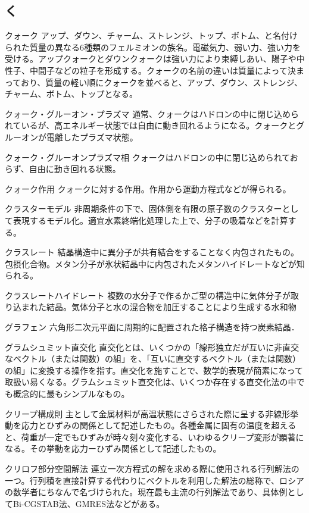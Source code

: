 \begin{用語集}
\section{く}
\item{クォーク}{}
{アップ、ダウン、チャーム、ストレンジ、トップ、ボトム、と名付けられた質量の異なる6種類のフェルミオンの族名。電磁気力、弱い力、強い力を受ける。アップクォークとダウンクォークは強い力により束縛しあい、陽子や中性子、中間子などの粒子を形成する。クォークの名前の違いは質量によって決まっており、質量の軽い順にクォークを並べると、アップ、ダウン、ストレンジ、チャーム、ボトム、トップとなる。}
\item{クォーク・グルーオン・プラズマ}{}
{通常、クォークはハドロンの中に閉じ込められているが、高エネルギー状態では自由に動き回れるようになる。クォークとグルーオンが電離したプラズマ状態。}
\item{クォーク・グルーオンプラズマ相}{}
{クォークはハドロンの中に閉じ込められておらず、自由に動き回れる状態。}
\item{クォーク作用}{}
{クォークに対する作用。作用から運動方程式などが得られる。}
\item{クラスターモデル}{}
{非周期条件の下で、固体側を有限の原子数のクラスターとして表現するモデル化。適宜水素終端化処理した上で、分子の吸着などを計算する。}
\item{クラスレート}{}
{結晶構造中に異分子が共有結合をすることなく内包されたもの。包摂化合物。メタン分子が氷状結晶中に内包されたメタンハイドレートなどが知られる。}
\item{クラスレートハイドレート}{}
{複数の水分子で作るかご型の構造中に気体分子が取り込まれた結晶。気体分子と水の混合物を加圧することにより生成する水和物}
\item{グラフェン}{}
{六角形二次元平面に周期的に配置された格子構造を持つ炭素結晶．}
\item{グラムシュミット直交化}{}
{直交化とは、いくつかの「線形独立だが互いに非直交なベクトル（または関数）の組」を、「互いに直交するベクトル（または関数）の組」に変換する操作を指す。直交化を施すことで、数学的表現が簡素になって取扱い易くなる。グラムシュミット直交化は、いくつか存在する直交化法の中でも概念的に最もシンプルなもの。}
\item{クリープ構成則}{}
{主として金属材料が高温状態にさらされた際に呈する非線形挙動を応力とひずみの関係として記述したもの。各種金属に固有の温度を超えると、荷重が一定でもひずみが時々刻々変化する、いわゆるクリープ変形が顕著になる。その挙動を応力ーひずみ関係として記述したもの。}
\item{クリロフ部分空間解法}{}
{連立一次方程式の解を求める際に使用される行列解法の一つ。行列積を直接計算する代わりにベクトルを利用した解法の総称で、ロシアの数学者にちなんで名づけられた。現在最も主流の行列解法であり、具体例としてBi-CGSTAB法、GMRES法などがある。}

\end{用語集}
